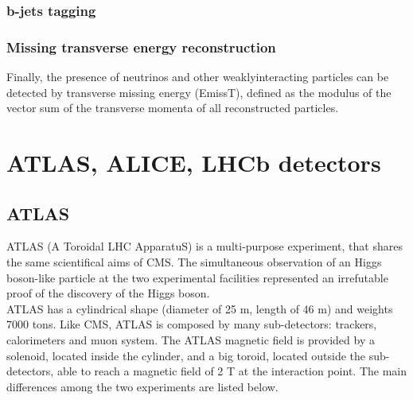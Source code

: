 \subsubsection{b-jets tagging}


\subsubsection{Missing transverse energy reconstruction}
Finally, the presence of neutrinos and other weaklyinteracting
particles can be detected by transverse missing energy (EmissT), defined as the modulus
of the vector sum of the transverse momenta of all reconstructed particles.



\section{ATLAS, ALICE, LHCb detectors}

\subsection{ATLAS}
ATLAS (A Toroidal LHC ApparatuS) is a multi-purpose experiment, that shares the same scientifical aims of CMS. The simultaneous observation of an Higgs boson-like particle at the two experimental facilities represented an irrefutable proof of the discovery of the Higgs boson.\\
ATLAS has a cylindrical shape (diameter of 25 m, length of 46 m) and weights 7000 tons. Like CMS, ATLAS is composed by many sub-detectors: trackers, calorimeters and muon system. The ATLAS magnetic field is provided by a solenoid, located inside the cylinder, and a big toroid, located outside the sub-detectors, able to reach a magnetic field of 2 T at the interaction point. The main differences among the two experiments are listed below.


